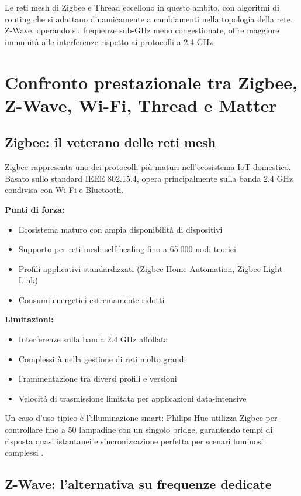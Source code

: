 Le reti mesh di Zigbee e Thread eccellono in questo ambito, con algoritmi di routing che si adattano dinamicamente a cambiamenti nella topologia della rete. Z-Wave, operando su frequenze sub-GHz meno congestionate, offre maggiore immunità alle interferenze rispetto ai protocolli a 2.4 GHz.

\section{Confronto prestazionale tra Zigbee, Z-Wave, Wi-Fi, Thread e Matter}

\subsection{Zigbee: il veterano delle reti mesh}

Zigbee rappresenta uno dei protocolli più maturi nell'ecosistema IoT domestico. Basato sullo standard IEEE 802.15.4, opera principalmente sulla banda 2.4 GHz condivisa con Wi-Fi e Bluetooth.

\textbf{Punti di forza:}
\begin{itemize}
    \item Ecosistema maturo con ampia disponibilità di dispositivi
    \item Supporto per reti mesh self-healing fino a 65.000 nodi teorici
    \item Profili applicativi standardizzati (Zigbee Home Automation, Zigbee Light Link)
    \item Consumi energetici estremamente ridotti
\end{itemize}

\textbf{Limitazioni:}
\begin{itemize}
    \item Interferenze sulla banda 2.4 GHz affollata
    \item Complessità nella gestione di reti molto grandi
    \item Frammentazione tra diversi profili e versioni
    \item Velocità di trasmissione limitata per applicazioni data-intensive
\end{itemize}

Un caso d'uso tipico è l'illuminazione smart: Philips Hue utilizza Zigbee per controllare fino a 50 lampadine con un singolo bridge, garantendo tempi di risposta quasi istantanei e sincronizzazione perfetta per scenari luminosi complessi \cite{ZWaveVsZigbee}.

\subsection{Z-Wave: l'alternativa su frequenze dedicate}


